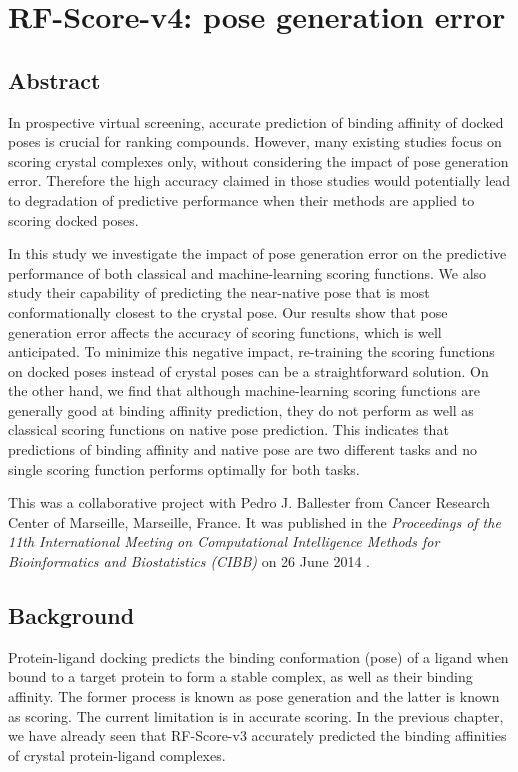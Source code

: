 \chapter{RF-Score-v4: pose generation error}

\section{Abstract}

In prospective virtual screening, accurate prediction of binding affinity of docked poses is crucial for ranking compounds. However, many existing studies focus on scoring crystal complexes only, without considering the impact of pose generation error. Therefore the high accuracy claimed in those studies would potentially lead to degradation of predictive performance when their methods are applied to scoring docked poses.

In this study we investigate the impact of pose generation error on the predictive performance of both classical and machine-learning scoring functions. We also study their capability of predicting the near-native pose that is most conformationally closest to the crystal pose. Our results show that pose generation error affects the accuracy of scoring functions, which is well anticipated. To minimize this negative impact, re-training the scoring functions on docked poses instead of crystal poses can be a straightforward solution. On the other hand, we find that although machine-learning scoring functions are generally good at binding affinity prediction, they do not perform as well as classical scoring functions on native pose prediction. This indicates that predictions of binding affinity and native pose are two different tasks and no single scoring function performs optimally for both tasks.

This was a collaborative project with Pedro J. Ballester from Cancer Research Center of Marseille, Marseille, France. It was published in the \textit{Proceedings of the 11th International Meeting on Computational Intelligence Methods for Bioinformatics and Biostatistics (CIBB)} on 26 June 2014 \citep{1434}.

\section{Background}

Protein-ligand docking predicts the binding conformation (pose) of a ligand when bound to a target protein to form a stable complex, as well as their binding affinity. The former process is known as pose generation and the latter is known as scoring. The current limitation is in accurate scoring. In the previous chapter, we have already seen that RF-Score-v3 accurately predicted the binding affinities of crystal protein-ligand complexes.

